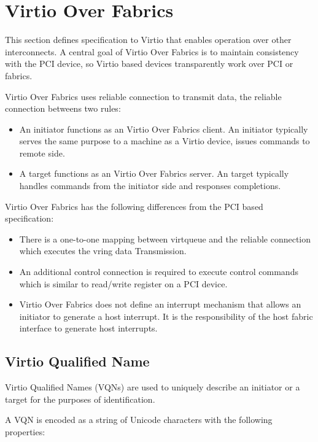 \section{Virtio Over Fabrics}\label{sec:Virtio Transport Options / Virtio Over Fabrics}

This section defines specification to Virtio that enables operation over other
interconnects. A central goal of Virtio Over Fabrics is to maintain consistency
with the PCI device, so Virtio based devices transparently work over PCI or
fabrics.

Virtio Over Fabrics uses reliable connection to transmit data, the reliable connection betweens two rules:

\begin{itemize}
\item An initiator functions as an Virtio Over Fabrics client. An initiator typically serves the same purpose to a machine as a Virtio device, issues commands to remote side.
\item A target functions as an Virtio Over Fabrics server. An target typically handles commands from the initiator side and responses completions.
\end{itemize}

Virtio Over Fabrics has the following differences from the PCI based specification:

\begin{itemize}
\item There is a one-to-one mapping between virtqueue and the reliable connection which executes the vring data Transmission.
\item An additional control connection is required to execute control commands which is similar to read/write register on a PCI device.
\item Virtio Over Fabrics does not define an interrupt mechanism that allows an initiator to generate a host interrupt. It is the responsibility of the host fabric interface to generate host interrupts.
\end{itemize}

\subsection{Virtio Qualified Name}\label{sec:Virtio Transport Options / Virtio Over Fabrics / Virtio Qualified Name}
Virtio Qualified Names (VQNs) are used to uniquely describe an initiator or a target for the purposes of identification.

A VQN is encoded as a string of Unicode characters with the following properties:

